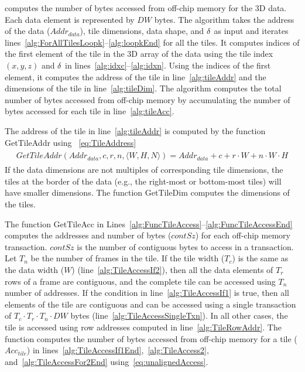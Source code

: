  computes the number of bytes accessed from off-chip memory for the 3D data. Each data element is represented by $DW$ bytes. The algorithm takes the address of the data ($Addr_{data}$), tile dimensions, data shape, and $\delta$ as input and iterates lines~\ref{alg:ForAllTilesLoopk}--\ref{alg:loopkEnd} for all the tiles. It computes indices of the first element of the tile in the 3D array of the data using the tile index $(x,y,z)$ and $\delta$ in lines~\ref{alg:idxc}--\ref{alg:idxn}. Using the indices of the first element, it computes the address of the tile in line~\ref{alg:tileAddr} and the dimensions of the tile in line~\ref{alg:tileDim}. The algorithm computes the total number of bytes accessed from off-chip memory by accumulating the number of bytes accessed for each tile in line~\ref{alg:tileAcc}. 

The address of the tile in line~\ref{alg:tileAddr} is computed by the function GetTileAddr using ~\eqref{eq:TileAddress}
\begin{align}\label{eq:TileAddress}
	\begin{split}
		GetTileAddr(Addr_{data},c,r,n,\langle W,H,N\rangle){=}Addr_{data} + c + r\cdot W + n\cdot W\cdot H
	\end{split}
\end{align}
If the data dimensions are not multiples of corresponding tile dimensions, the tiles at the border of the data (e.g., the right-most or bottom-most tiles) will have smaller dimensions. The function GetTileDim computes the dimensions of the tiles.

The function GetTileAcc in Lines~\ref{alg:FuncTileAccess}--\ref{alg:FuncTileAccessEnd} computes the addresses and number of bytes ($contSz$) for each off-chip memory transaction. $contSz$ is the number of contiguous bytes to access in a transaction. Let $T_n$ be the number of frames in the tile. If the tile width ($T_c$) is the same as the data width ($W$) (line~\ref{alg:TileAccessIf2}), then all the data elements of $T_r$ rows of a frame are contiguous, and the complete tile can be accessed using $T_n$ number of addresses. If the condition in line~\ref{alg:TileAccessIf1} is true, then all elements of the tile are contiguous and can be accessed using a single transaction of $T_c\cdot T_r\cdot T_n\cdot DW$ bytes (line~\ref{alg:TileAccessSingleTxn}). In all other cases, the tile is accessed using row addresses computed in line~\ref{alg:TileRowAddr}. The function computes the number of bytes accessed from off-chip memory for a tile ($Acc_{tile}$) in lines~\ref{alg:TileAccessIf1End},~\ref{alg:TileAccess2}, and~\ref{alg:TileAccessFor2End} using~\eqref{eq:unalignedAccess}. 



